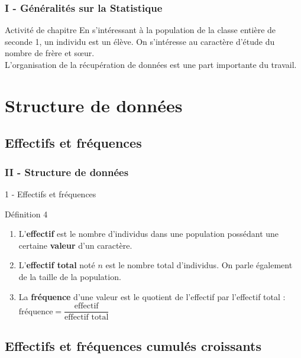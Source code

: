 \documentclass{beamer}
\begin{document}
\begin{frame}
  \frametitle{I - Généralités sur la Statistique}

  \begin{exampleblock}{Activité de chapitre}
    En s'intéressant à la population de la classe entière de seconde 1, un individu est un élève. On s'intéresse au caractère d'étude du nombre de frère et sœur.\\
    L'organisation de la récupération de données est une part importante du travail.
  \end{exampleblock}
\end{frame}

\section{Structure de données}
\subsection{Effectifs et fréquences}

\begin{frame}
  \frametitle{II - Structure de données}

  \begin{block}{1 - Effectifs et fréquences}
    \begin{alertblock}{Définition 4}
      \begin{enumerate}
      \item L'\textbf{effectif} est le nombre d'individus dans une population possédant une certaine \textbf{valeur} d'un caractère.
      \item L'\textbf{effectif total} noté $n$ est le nombre total d'individus. On parle également de la taille de la population.
      \item La \textbf{fréquence} d'une valeur est le quotient de l'effectif par l'effectif total : $\text{fréquence} = \dfrac{\text{effectif}}{\text{effectif total}}$
      \end{enumerate}
    \end{alertblock}
  \end{block}
\end{frame}

\subsection{Effectifs et fréquences cumulés croissants}
\end{document}
